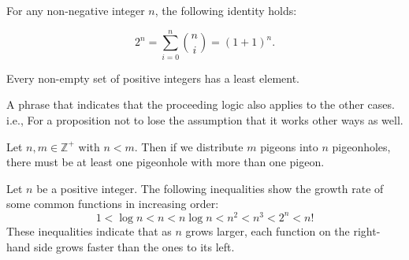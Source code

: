 \newpage

\begin{theo}

    \label{thm:binomial_2n}

    For any non-negative integer \(n\), the following identity holds:
    
    \[
    2^n = \sum_{i=0}^{n} \binom{n}{i} = (1 + 1)^n.
    \]

\end{theo}

\begin{Def}

    \label{def:well_ordering_principle}

    Every non-empty set of positive integers has a least element.
\end{Def}

\begin{Def}

    \label{def:wlog}

    A phrase that indicates that the proceeding logic also applies to the other cases.
    i.e., For a proposition not to lose the assumption that it works other ways as well.

\end{Def}
\begin{theo}

    Let \( n, m \in \mathbb{Z}^+ \) with \( n < m \). Then if we distribute \( m \) pigeons into \( n \) pigeonholes, there must be at least one pigeonhole with more than one pigeon.
\end{theo}

\begin{theo}

    Let $n$ be a positive integer. The following inequalities show the growth rate of some common functions in increasing order:
    \LARGE
    \[
    1 < \log n < n < n \log n < n^2 < n^3 < 2^n < n!
    \]
    \normalsize
    These inequalities indicate that as $n$ grows larger, each function on the right-hand side grows faster than the ones to its left.
    
\end{theo}






